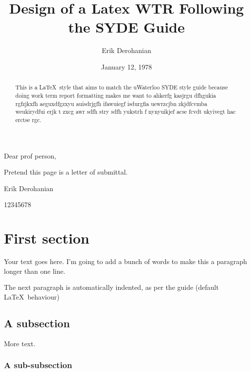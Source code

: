 \documentclass[12pt]{article}
\title{Design of a Latex WTR Following the SYDE Guide}
\author{Erik Derohanian}
\date{January 12, 1978}
\begin{document}
	\startindent
	\makewtrtitle

	\stopindent
	Dear prof person,

	Pretend this page is a letter of submittal.

	Erik Derohanian

	12345678

	\newpage
	\startindent

	\begin{abstract}
		This is a \LaTeX\ style that aims to match the uWaterloo SYDE style guide because doing work term report formatting makes me want to ahkerfg kasjrgu dfhgukia rgfzjkxfh aeguxdfgzxyu auisdrjgfh ifawuiegf isdurgfia uewrzcjbn zkjdfcvmba weukirydfui erjk t  zxcg awr sdfh stry sdfh yukstrh f nynyuikjef acse fcvdt ukyivegt hac erctse rgc.
	\end{abstract}

	\tableofcontents
	\newpage

	\listoffigures
	\newpage
	\listoftables
	\newpage

	\startarabicpagenumbers

	\section{First section}

	Your text goes here. I'm going to add a bunch of words to make this a paragraph longer than one line.

	The next paragraph is automatically indented, as per the guide (default \LaTeX\ behaviour)

	\subsection{A subsection}

	More text.

	\subsubsection{A sub-subsection}
\end{document}
